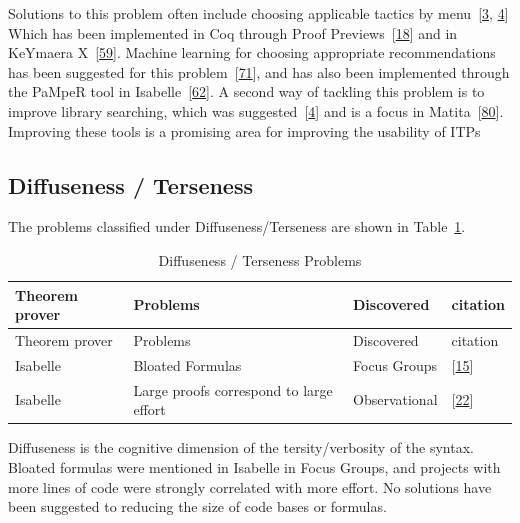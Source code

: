 \documentclass[
]{article}
\begin{document}
Solutions to this problem often include choosing applicable tactics by
menu~{[}\protect\hyperlink{ref-aitken_interactive_1998}{3},
\protect\hyperlink{ref-aitken_analysis_2000}{4}{]} Which has been
implemented in Coq through Proof
Previews~{[}\protect\hyperlink{ref-berman_development_2014}{18}{]} and
in KeYmaera X~{[}\protect\hyperlink{ref-mitsch_keymaera_2017}{59}{]}.
Machine learning for choosing appropriate recommendations has been
suggested for this
problem~{[}\protect\hyperlink{ref-ringer_replica_2020}{71}{]}, and has
also been implemented through the PaMpeR tool in
Isabelle~{[}\protect\hyperlink{ref-nagashima_pamper_2018}{62}{]}. A
second way of tackling this problem is to improve library searching,
which was
suggested~{[}\protect\hyperlink{ref-aitken_analysis_2000}{4}{]} and is a
focus in
Matita~{[}\protect\hyperlink{ref-tassi_interactive_2008}{80}{]}.
Improving these tools is a promising area for improving the usability of
ITPs

\hypertarget{diffuseness-terseness}{%
\subsection{Diffuseness / Terseness}\label{diffuseness-terseness}}

The problems classified under Diffuseness/Terseness are shown in
Table~\ref{tbl:diffuseness}.

\hypertarget{tbl:diffuseness}{}
\begin{longtable}[]{@{}llll@{}}
\caption{\label{tbl:diffuseness}Diffuseness / Terseness
Problems}\tabularnewline
\toprule
Theorem prover & Problems & Discovered & citation \\
\midrule
\endfirsthead
\toprule
Theorem prover & Problems & Discovered & citation \\
\midrule
\endhead
Isabelle & Bloated Formulas & Focus Groups &
{[}\protect\hyperlink{ref-beckert_usability_2015}{15}{]} \\
Isabelle & Large proofs correspond to large effort & Observational &
{[}\protect\hyperlink{ref-bourke_challenges_2012}{22}{]} \\
\bottomrule
\end{longtable}

Diffuseness is the cognitive dimension of the tersity/verbosity of the
syntax. Bloated formulas were mentioned in Isabelle in Focus Groups, and
projects with more lines of code were strongly correlated with more
effort. No solutions have been suggested to reducing the size of code
bases or formulas.
\end{document}
